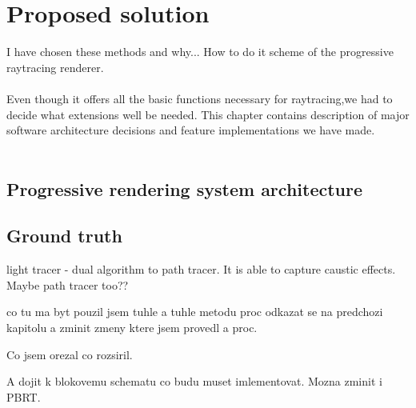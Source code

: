 \chapter{Proposed solution}
\label{chap:PROPOSAL}
I have chosen these methods and why... How to do it scheme of the progressive raytracing renderer.
\\
\\
Even though it offers all the basic functions necessary for raytracing,we had to decide what extensions well be needed. This chapter contains description of major software architecture decisions and feature implementations we have made.
\\
\\
\section{Progressive rendering system architecture}


\section{Ground truth}
light tracer - dual algorithm to path tracer. It is able to capture caustic effects. Maybe path tracer too??

co tu ma byt
pouzil jsem tuhle a tuhle metodu proc odkazat se na predchozi kapitolu a zminit zmeny ktere jsem provedl a proc.

Co jsem orezal co rozsiril.

A dojit k blokovemu schematu co budu muset imlementovat. Mozna zminit i PBRT. 



